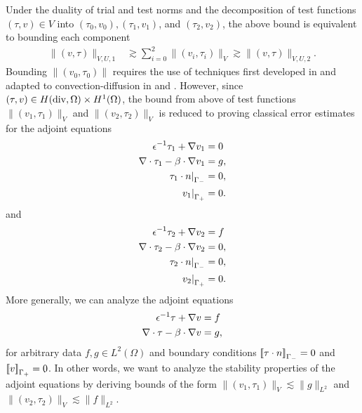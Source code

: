 Under the duality of trial and test norms and the decomposition of test functions $\left(\tau,v\right) \in V$ into $\left(\tau_0,v_0\right), \left(\tau_1,v_1\right)$, and $\left(\tau_2,v_2\right)$, the above bound is equivalent to bounding each component 
\begin{align*}
\|\left(v,\tau\right)\|_{V,U,1} &\gtrsim \sum_{i=0}^2\|\left(v_{i},\tau_{i}\right)\|_V \gtrsim \|\left(v,\tau\right)\|_{V,U,2}.
\end{align*}
Bounding $\|\left(v_0,\tau_0\right)\|$ requires the use of techniques first developed in \cite{analysisDPG} and adapted to convection-diffusion in \cite{analysisDPG} and \cite{DPGrobustness}. However, since $\left(\tau,v\right) \in H({\rm div}, \Omega)\times H^1(\Omega)$, the bound from above of test functions $\|\left(v_{1},\tau_{1}\right)\|_V$ and $\|\left(v_{2},\tau_{2}\right)\|_V$ is reduced to proving classical error estimates for the adjoint equations
\begin{align*}
\epsilon^{-1}\tau_1 + \grad {v_1} &= 0 \\
\div {\tau_1} - \beta\cdot \grad {v_1} &=  g, \\
\left.\tau_1\cdot n\right|_{\Gamma_-} &= 0, \\
\left.v_1\right|_{\Gamma_+} &= 0.
\end{align*} 
and 
\begin{align*}
\epsilon^{-1}\tau_2 + \grad {v_2} &= f \\
\div {\tau_2} - \beta\cdot \grad {v_2} &= 0, \\
\left.\tau_2\cdot n\right|_{\Gamma_-} &= 0, \\
\left.v_2\right|_{\Gamma_+} &= 0.
\end{align*} 
More generally, we can analyze the adjoint equations
\begin{align}
\epsilon^{-1}\tau + \grad {v} &= f \label{adjoint1}\\
\div {\tau} - \beta\cdot \grad {v} &= g, \label{adjoint2}
\end{align}
for arbitrary data $f, g\in L^2({\Omega})$ and boundary conditions $\jump{\tau\cdot n}_{\Gamma_-} = 0$ and $\jump{v}_{\Gamma_+} = 0$.  In other words, we want to analyze the stability properties of the adjoint equations by deriving bounds of the form $\|\left(v_1,\tau_1\right)\|_V\lesssim \|g\|_{L^2}$ and $\|\left(v_2,\tau_2\right)\|_V \lesssim \|f\|_{L^2}$.  

